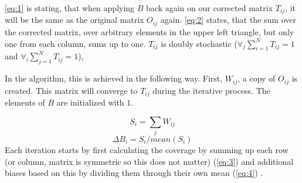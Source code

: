 
\eqref{eq:1} is stating, that when applying $B$ back again on our corrected
matrix $T_{ij}$, it will be the same as the original matrix $O_{ij}$ again.
\eqref{eq:2} states, that the sum over the corrected matrix, over arbitrary
elements in the upper left triangle, but only one from each column, sums up to
one. $T_{ij}$ is doubly stochastic ($\forall_j\sum^N_{i=1}T_{ij} = 1$ and
$\forall_i\sum^N_{j=1}T_{ij} = 1$), 


In the algorithm, this is achieved in the following way. First, $W_{ij}$, a
copy of $O_{ij}$ is created. This matrix will converge to $T_{ij}$ during the
iterative process. The elements of $B$ are initialized with $1$.


\begin{equation}\label{eq:3}
    S_i = \sum_j W_{ij}
\end{equation}
\begin{equation}\label{eq:4}
    \Delta B_i = S_i / mean(S_i)
\end{equation}
Each iteration starts by first calculating the coverage by summing up each row
(or column, matrix is symmetric so this does not matter) (\eqref{eq:3}) and
additional biases based on this by dividing them through their own mean
(\eqref{eq:4}) .

